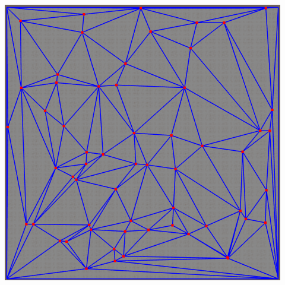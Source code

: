 \documentclass[a4paper, 12pt]{article}   	%
\begin{document}
\begin{center}
\begin{minipage}{0.47\linewidth}
        \end{minipage}
        \begin{minipage}{0.47\linewidth}
            \includegraphics[width=\linewidth]{img/triang_super_59}
        \end{minipage}
    \end{center}
    
\end{document}
